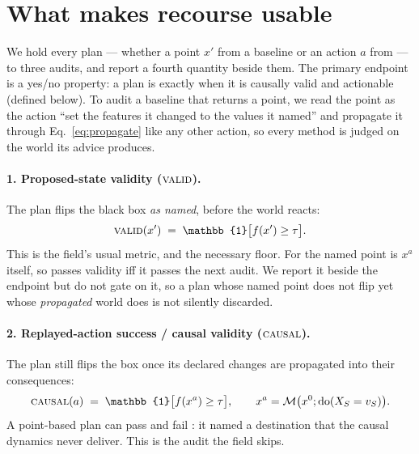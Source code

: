 \section{What makes recourse usable}
\label{sec:desiderata}

We hold every plan --- whether a point $x'$ from a baseline or an action $a$ from
\cac{} --- to three audits, and report a fourth quantity beside them. The primary
endpoint is a yes/no property: a plan is \Usable{} exactly when it is causally
valid and actionable (defined below). To audit a baseline that returns a point, we
read the point as the action ``set the features it changed to the values it
named'' and propagate it through Eq.~\eqref{eq:propagate} like any other action, so
every method is judged on the world its advice produces.

\paragraph{1. Proposed-state validity ($\textsc{valid}$).} The plan flips the black box
\emph{as named}, before the world reacts:
\begin{equation}
  \Valid(x') \;=\; \mathbb{1}\big[f(x')\ge\tau\big].
\end{equation}
This is the field's usual metric, and the necessary floor. For \cac{} the named
point is $x^{a}$ itself, so \cac{} passes validity iff it passes the next audit.
We report it beside the endpoint but do not gate on it, so a plan whose named
point does not flip yet whose \emph{propagated} world does is not silently
discarded.

\paragraph{2. Replayed-action success / causal validity ($\textsc{causal}$).} The plan
still flips the box once its declared changes are propagated into their
consequences:
\begin{equation}
  \Causal(a) \;=\; \mathbb{1}\big[f(x^{a})\ge\tau\big],
  \qquad x^{a}=\mathcal{M}\big(x^{0};\dopart{X_S=v_S}\big).
\end{equation}
A point-based plan can pass \Valid{} and fail \Causal{}: it named a destination
that the causal dynamics never deliver. This is the audit the field skips.

